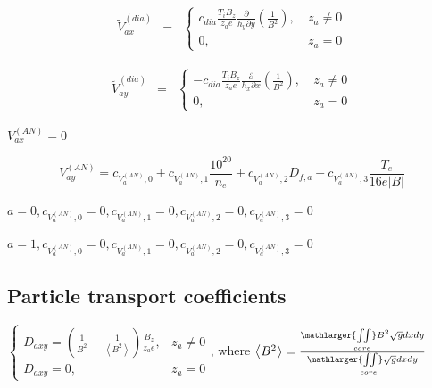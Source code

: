 \documentclass[a4paper,10pt]{report}
\begin{document}

\begin{equation}
\begin{matrix}
\widetilde{V}_{ax}^{\left( dia \right)} & =
& \left\{
\begin{matrix}
c_{dia} \frac{T_i B_z}{z_a e}   \frac{\partial}{h_y\partial y} \left(\frac 1{B^2} \right), & \ z_a \neq 0 \\
0, & \ z_a = 0
\end{matrix} \right.
\end{matrix}
\end{equation}

\begin{equation}
\begin{matrix}
\widetilde{V}_{ay}^{\left( dia \right)} & =
& \left\{
\begin{matrix}
-c_{dia} \frac{T_i B_z}{z_a e}   \frac{\partial}{h_x\partial x} \left(\frac 1{B^2} \right), & \ z_a \neq 0 \\
0, & \ z_a = 0
\end{matrix} \right.
\end{matrix}
\end{equation}

$V_{ax}^{(AN)}=0$

\begin{equation*}
V_{ay}^{(AN)} = c_{V_a^{(AN)},0} + c_{V_a^{(AN)},1} \frac{10^{20}}{n_e} + c_{V_a^{(AN)},2} D_{f,a} + c_{V_a^{(AN)},3} \frac{T_e}{16 e|B|}
\end{equation*}

$a=0, c_{V_a^{(AN)},0}=0, c_{V_a^{(AN)},1}=0, c_{V_a^{(AN)},2}=0, c_{V_a^{(AN)},3}=0$

$a=1, c_{V_a^{(AN)},0}=0, c_{V_a^{(AN)},1}=0, c_{V_a^{(AN)},2}=0, c_{V_a^{(AN)},3}=0$

\subsection{Particle transport coefficients}

$
\left\{
\begin{matrix}
D_{axy}= \left( \frac 1{B^2} - \frac 1{\left\langle B^2\right\rangle}   \right)  \frac{B_z}{z_a e}, & z_a \neq 0\\
D_{axy}=0, & z_a=0
\end{matrix}
\right.
$, where $\left \langle B^2 \right \rangle = \frac{\mathlarger{\iint \limits_{core}} B^2 \sqrt{g} dx dy}{\mathlarger{\iint \limits_{core}} \sqrt{g} dx dy}$
\end{document}
